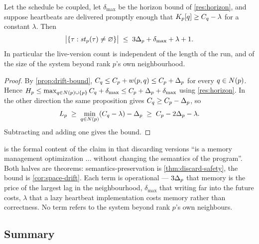 \begin{corollary}
\label{cor:space-drift}
Let the schedule be coupled, let $\delta_{\max}$ be the horizon bound of
\cref{res:horizon}, and suppose \glspl{heartbeat} are delivered promptly
enough that $K_{p}[q] \ge C_{q} - \lambda$ for a constant $\lambda$. Then
\[
  \bigl|\{\tau : \mathit{st}_{p}(\tau) \ne \varnothing\}\bigr|
  \;\le\; 3\Delta_p + \delta_{\max} + \lambda + 1 .
\]
In particular the live-version count is independent of the length of the run,
and of the size of the system beyond rank $p$'s own neighbourhood.
\end{corollary}

\begin{proof}
By \cref{prop:drift-bound}, $C_{q} \le C_{p} + w(p,q) \le C_{p} +
\Delta_p$ for every $q \in N(p)$. Hence
$H_p \le \max_{q \in N(p) \cup \{p\}} C_{q} + \delta_{\max}
 \le C_{p} + \Delta_p + \delta_{\max}$ using \cref{res:horizon}. In the other
direction the same proposition gives $C_{q} \ge C_{p} - \Delta_p$, so
\[
  L_p \;\ge\; \min_{q \in N(p)} (C_{q} - \lambda) - \Delta_p
      \;\ge\; C_{p} - 2\Delta_p - \lambda .
\]
Subtracting and adding one gives the bound.
\end{proof}

 is the formal content of the claim in \cite{dstm2026}
that discarding \glspl{version} ``is a memory management optimization $\dots$
without changing the semantics of the program''. Both halves are theorems:
semantics-preservation is \cref{thm:discard-safety}, the bound is
\cref{cor:space-drift}. Each term is operational --- $3\Delta_p$ that memory
is the price of the largest \gls{lag} in the neighbourhood, $\delta_{\max}$
that writing far into the future costs, $\lambda$ that a lazy
\gls{heartbeat} implementation costs memory rather than correctness. No term
refers to the system beyond rank $p$'s own neighbours.

\subsection{Summary}
\label{sec:sync-summary}

